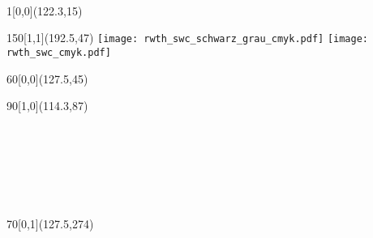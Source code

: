 \begin{titlepage}
  ~ %

  \begin{textblock}{1}[0,0](122.3,15)
    \noindent
    \ifisbw
    \else
    \fi
  \end{textblock}
	\begin{textblock}{150}[1,1](192.5,47)
    \noindent\flushright\noindent
    \ifisbw
      \texttt{[image: rwth\_swc\_schwarz\_grau\_cmyk.pdf]}
    \else
      \texttt{[image: rwth\_swc\_cmyk.pdf]}
    \fi
	\end{textblock}

  \begin{textblock}{60}[0,0](127.5,45)
    \noindent\flushleft
    \\[.5\baselineskip]
  \end{textblock}

  \begin{textblock}{90}[1,0](114.3,87)
    \begin{minipage}[!c][140mm][c]{90mm}
      \noindent\flushright
      \noindent{\textsc{\THESISTYPE}}\\[2\baselineskip]

      {
        \noindent{\LARGE{\textbf{\TITLEGER}}}\\[1\baselineskip]
        \noindent{\LARGE{\TITLEENG}}
      }\\[2\baselineskip]

      \\[.5\baselineskip]
      \noindent{\textbf{{\AUTHOR}}}\\[2\baselineskip]

    \end{minipage}
  \end{textblock}


  \begin{textblock}{70}[0,1](127.5,274)
    \noindent\flushleft
    \\[.5\baselineskip]
    \noindent{{\REVIEWERONE}}\\[.5\baselineskip]
    \noindent{{\REVIEWERTWO}}\\[2\baselineskip]

    \\[.5\baselineskip]
    \noindent{{\SUPERVISOR}}
  \end{textblock}

\end{titlepage} 
